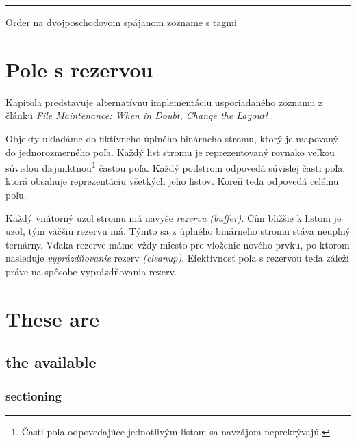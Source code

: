 \documentclass[
  digital,     %
  oneside,     %
  nosansbold,  %
  nocolorbold, %
  lof,         %
  lot,         %
]{fithesis4}
\begin{document}
\begin{algorithm}
\hrule\vspace{0.2em}
{
    \;
}
\;
\caption{Order na dvojposchodovom spájanom zozname s tagmi}
\end{algorithm}

\clearpage

\chapter{Pole s rezervou}

Kapitola predstavuje alternatívnu implementáciu usporiadaného zoznamu z článku \textit{File Maintenance: When in Doubt, Change the Layout!} \cite{paper2_file_maintenance}.

Objekty ukladáme do fiktívneho úplného binárneho stromu, ktorý je mapovaný do jednorozmerného poľa. Každý list stromu je reprezentovaný rovnako veľkou súvislou disjunktnou\footnote{Časti poľa odpovedajúce jednotlivým listom sa navzájom neprekrývajú.} častou poľa. Každý podstrom odpovedá súvislej časti poľa, ktorá obsahuje reprezentáciu všetkých jeho listov. Koreň teda odpovedá celému poľu.

Každý vnútorný uzol stromu má navyše \textit{rezervu (buffer)}. Čím bližšie k listom je uzol, tým väčšiu rezervu má. Týmto sa z úplného binárneho stromu stáva neuplný ternárny. Vďaka rezerve máme vždy miesto pre vloženie nového prvku, po ktorom nasleduje \textit{vyprázdňovanie} rezerv \textit{(cleanup)}. Efektívnosť poľa s rezervou teda záleží práve na spôsobe vyprázdňovania rezerv.






\clearpage

\chapter{These are}
\section{the available}
\subsection{sectioning}
\end{document}
